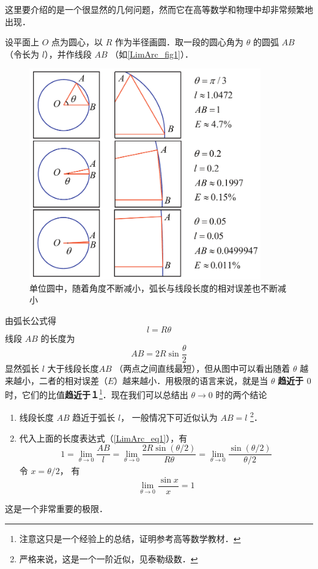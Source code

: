 

这里要介绍的是一个很显然的几何问题，然而它在高等数学和物理中却非常频繁地出现．

设平面上 $O$ 点为圆心，以 $R$ 作为半径画圆．取一段的圆心角为 $\theta $ 的圆弧 $AB$ （令长为 $l$），并作线段 $AB$ （如\autoref{LimArc_fig1}）．

\begin{figure}[ht]
\centering
\includegraphics[width=10cm]{./figures/LimArc.pdf}
\caption{单位圆中，随着角度不断减小，弧长与线段长度的相对误差也不断减小}\label{LimArc_fig1}
\end{figure}

由弧长公式得
\begin{equation} \label{LimArc_eq1}
l = R\theta 
\end{equation}
线段 $AB$ 的长度为
\begin{equation}\label{LimArc_eq2}
AB = 2R\sin \frac{\theta }{2}
\end{equation}
显然弧长 $l$ 大于线段长度$AB$ （两点之间直线最短），但从图中可以看出随着 $\theta $ 越来越小，二者的相对误差（$E$）越来越小．用极限的语言来说，就是当 $\theta $ \textbf{趋近于 $0$ } 时，它们的比值\textbf{趋近于１}\footnote{注意这只是一个经验上的总结，证明参考高等数学教材．}．现在我们可以总结出 $\theta \to 0$ 时的两个结论

\begin{enumerate}
\item 线段长度 $AB$ 趋近于弧长 $l$， 一般情况下可近似认为 $AB = l$ \footnote{严格来说，这是一个一阶近似，见泰勒级数．}． %

\item 代入上面的长度表达式（\autoref{LimArc_eq1}），有
\begin{equation}
1=\lim_{\theta\to 0}\frac{AB}{l} = \lim_{\theta\to 0}\frac{{2R\sin ({\theta }/{2})}}{{R\theta }} 
= \lim_{\theta\to 0}\frac{{\sin ({\theta }/{2})}}{{{\theta }/{2}}}
\end{equation}
令 $x = \theta/2$， 有
\begin{equation}
\lim_{\theta\to 0}\frac{{\sin x}}{x} = 1
\end{equation}
\end{enumerate}

这是一个非常重要的极限．










